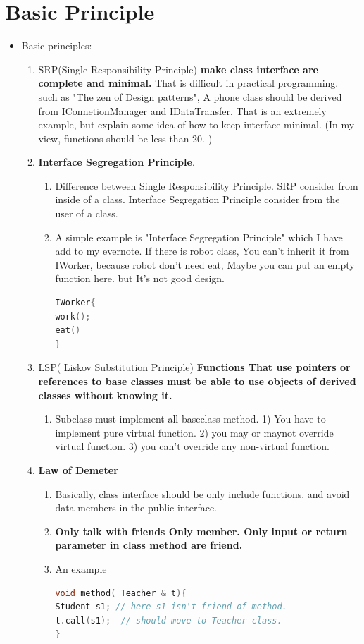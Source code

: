 \documentclass[a4paper,12pt,twoside]{book}
\begin{document}
\section{Basic Principle}
\begin{itemize}

\item Basic principles: 
\begin{enumerate}
\item SRP(Single Responsibility Principle) \textbf{make class interface are complete and minimal.}  That is difficult in practical programming. such as "The zen of Design patterns", A phone class should be derived from IConnetionManager and IDataTransfer. That is an extremely example, but explain some idea of how to keep interface minimal. (In my view, functions should be less than 20. )

\item \textbf{Interface Segregation Principle}. 
\begin{enumerate}
\item Difference between Single Responsibility Principle. SRP consider from inside of a class. Interface Segregation Principle consider from the user of a class. 

\item A simple example is "Interface Segregation Principle" which I have add to my evernote.  If there is robot class, You can't inherit it from IWorker, because robot don't need eat, Maybe you can put an empty function here. but It's not good design. 
\begin{lstlisting}[frame=single, language=c++]
IWorker{
work();
eat()
}
\end{lstlisting}
\end{enumerate}


\item LSP( Liskov Substitution Principle) \textbf{Functions That use pointers or references to base classes must be able to use objects of derived classes without knowing it. }
\begin{enumerate}
\item Subclass must implement all baseclass method.  1) You have to implement pure virtual function.  2) you may or maynot override virtual function.  3) you can't override any non-virtual function. 
\end{enumerate}

\item \textbf{Law of Demeter}
\begin{enumerate}
 \item Basically, class interface should be only include functions. and avoid data members in the public interface.
 \item  \textbf{Only talk with friends Only member. Only input or return parameter in class method are friend.}
 \item An example
 \begin{lstlisting}[frame=single, language=c++]
void method( Teacher & t){
Student s1; // here s1 isn't friend of method. 
t.call(s1);  // should move to Teacher class. 
}
\end{lstlisting}


\end{enumerate}
\end{enumerate}
\end{itemize}
\end{document}
